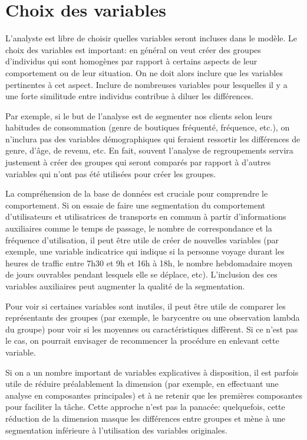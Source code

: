 \documentclass[
  11pt,
  letterpaper,
]{scrbook}
\theoremstyle{definition}
\theoremstyle{remark}
\begin{document}
\hypertarget{choix-des-variables}{%
\section{Choix des variables}\label{choix-des-variables}}

L'analyste est libre de choisir quelles variables seront incluses dans
le modèle. Le choix des variables est important: en général on veut
créer des groupes d'individus qui sont homogènes par rapport à certains
aspects de leur comportement ou de leur situation. On ne doit alors
inclure que les variables pertinentes à cet aspect. Inclure de
nombreuses variables pour lesquelles il y a une forte similitude entre
individus contribue à diluer les différences.

Par exemple, si le but de l'analyse est de segmenter nos clients selon
leurs habitudes de consommation (genre de boutiques fréquenté,
fréquence, etc.), on n'inclura pas des variables démographiques qui
feraient ressortir les différences de genre, d'âge, de revenu, etc. En
fait, souvent l'analyse de regroupements servira justement à créer des
groupes qui seront comparés par rapport à d'autres variables qui n'ont
pas été utilisées pour créer les groupes.

La compréhension de la base de données est cruciale pour comprendre le
comportement. Si on essaie de faire une segmentation du comportement
d'utilisateurs et utilisatrices de transports en commun à partir
d'informations auxiliaires comme le temps de passage, le nombre de
correspondance et la fréquence d'utilisation, il peut être utile de
créer de nouvelles variables (par exemple, une variable indicatrice qui
indique si la personne voyage durant les heures de traffic entre 7h30 et
9h et 16h à 18h, le nombre hebdomadaire moyen de jours ouvrables pendant
lesquels elle se déplace, etc). L'inclusion des ces variables
auxiliaires peut augmenter la qualité de la segmentation.

Pour voir si certaines variables sont inutiles, il peut être utile de
comparer les représentants des groupes (par exemple, le barycentre ou
une observation lambda du groupe) pour voir si les moyennes ou
caractéristiques diffèrent. Si ce n'est pas le cas, on pourrait
envisager de recommencer la procédure en enlevant cette variable.

Si on a un nombre important de variables explicatives à disposition, il
est parfois utile de réduire préalablement la dimension (par exemple, en
effectuant une analyse en composantes principales) et à ne retenir que
les premières composantes pour faciliter la tâche. Cette approche n'est
pas la panacée: quelquefois, cette réduction de la dimension masque les
différences entre groupes et mène à une segmentation inférieure à
l'utilisation des variables originales.
\end{document}
